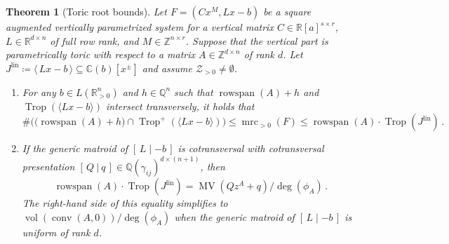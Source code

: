 \documentclass[11pt,reqno,a4paper]{amsart}
\numberwithin{equation}{section}
\theoremstyle{theoremstyle}
\newtheorem{theorem}{Theorem}[section]
\theoremstyle{examplestyle}
\newcommand{\CC}{\mathbb{C}}
\newcommand{\RR}{\mathbb{R}}
\newcommand{\QQ}{\mathbb{Q}}
\newcommand{\ZZ}{\mathbb{Z}}
\newcommand{\lin}{{\mathrm{lin}}}
\DeclareMathOperator{\mrc}{mrc}
\DeclareMathOperator{\rowspan}{rowspan}
\DeclareMathOperator{\conv}{conv}
\DeclareMathOperator{\MV}{MV}
\DeclareMathOperator{\vol}{vol}
\DeclareMathOperator{\Trop}{Trop}
\begin{document}
 
\begin{theorem}[Toric root bounds]
\label{thm:toric_root_bound}\label{thm:toric_and_transversal}
Let $F=(C x^M, Lx-b)$ be a
square augmented vertically parametrized system for 
a vertical matrix $C\in \RR[a]^{s\times r}$, $L\in \mathbb{R}^{d\times n}$ of full row rank, and $M\in \mathbb{Z}^{n\times r}$. 
Suppose that the vertical part is parametrically toric with respect to a matrix $A\in\ZZ^{d\times n}$ of rank $d$. 
Let $J^{\lin} \coloneqq \langle\,L x- b\,\rangle \subseteq \CC(b)[x^\pm]$ and assume $\mathcal{Z}_{>0}\neq\emptyset$. 

\begin{enumerate}[label=(\roman*)]
\item  For any $b \in L(\RR^n_{>0})$ and $h \in \QQ^n$ such that $\rowspan(A) + h$ and  $\Trop(\langle Lx-b\rangle)$ intersect transversely, it holds that 
\[ \#\Big( \big(\rowspan(A) + h\big) \cap \Trop^+(\langle Lx-b\rangle) \Big) \leq \mrc_{>0}(F)\leq \rowspan(A)\cdot \Trop(J^{\lin})\,. \]
 \item If the generic matroid of $[\,L\mid -b\,]$
      is cotransversal with cotransversal presentation $[\,Q\ | \ q\,] \in \QQ(\gamma_{ij})^{d\times (n+1)}$, then  
\[\rowspan(A)\cdot \Trop(J^{\lin})= \MV(Q z^A +q)/\deg(\phi_A)\,.  \]
The right-hand side of this equality simplifies to $\vol(\conv(A,0))/\deg(\phi_A)$ when the generic matroid of $[\,L\mid -b\,]$ is uniform of rank $d$.   
\end{enumerate}
\end{theorem}
\end{document}
